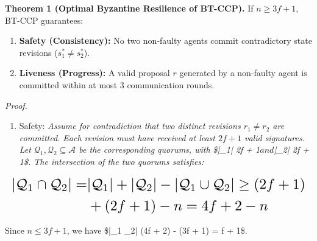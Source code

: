 \documentclass[10pt,twocolumn,letterpaper]{article}
\begin{document}
\textbf{Theorem 1 (Optimal Byzantine Resilience of BT-CCP).} If $n \ge 3f + 1$, BT-CCP guarantees:
\begin{enumerate}
  \item \textbf{Safety (Consistency):} No two non-faulty agents commit contradictory state revisions ($s_1^* \ne s_2^*$).
  \item \textbf{Liveness (Progress):} A valid proposal $r$ generated by a non-faulty agent is committed within at most 3 communication rounds.
\end{enumerate}

\textit{Proof.} 
\begin{enumerate}
  \item Safety:\textit{ Assume for contradiction that two distinct revisions $r_1 \ne r_2$ are committed. Each revision must have received at least $2f + 1$ valid signatures. Let $\mathcal{Q}_1, \mathcal{Q}_2 \subseteq \mathcal{A}$ be the corresponding quorums, with \$|\_1| \ge 2f + 1$ and $|\_2| \ge 2f + 1\$. The intersection of the two quorums satisfies:}
\end{enumerate}



















\begin{equation}
\resizebox{\columnwidth}{!}{$\displaystyle
\begin{aligned}
|\mathcal{Q}_1 \cap \mathcal{Q}_2| = & |\mathcal{Q}_1| + |\mathcal{Q}_2| - |\mathcal{Q}_1 \cup \mathcal{Q}_2| \ge (2f + 1) \\
& + (2f + 1) - n = 4f + 2 - n
\end{aligned}
$}
\end{equation}



















Since $n \le 3f + 1$, we have \$|\_1 \cap {}\_2| \ge (4f + 2) - (3f + 1) = f + 1\$. 
\end{document}
